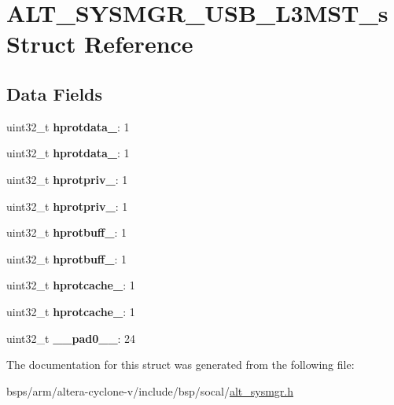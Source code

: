 \hypertarget{structALT__SYSMGR__USB__L3MST__s}{}\section{A\+L\+T\+\_\+\+S\+Y\+S\+M\+G\+R\+\_\+\+U\+S\+B\+\_\+\+L3\+M\+S\+T\+\_\+s Struct Reference}
\label{structALT__SYSMGR__USB__L3MST__s}
\subsection*{Data Fields}
\begin{DoxyCompactItemize}
\item 
\mbox{\label{structALT__SYSMGR__USB__L3MST__s_aa02b0f11931a8afcc1925e778977a89f}} 
uint32\+\_\+t {\bfseries hprotdata\+\_}\+: 1
\item 
\mbox{\label{structALT__SYSMGR__USB__L3MST__s_ad0e541615870d715237df3e728206236}} 
uint32\+\_\+t {\bfseries hprotdata\+\_}\+: 1
\item 
\mbox{\label{structALT__SYSMGR__USB__L3MST__s_ab379de425e746652e5dcb5ea31de1a67}} 
uint32\+\_\+t {\bfseries hprotpriv\+\_}\+: 1
\item 
\mbox{\label{structALT__SYSMGR__USB__L3MST__s_a6714299fde13af6226376ddb66f37986}} 
uint32\+\_\+t {\bfseries hprotpriv\+\_}\+: 1
\item 
\mbox{\label{structALT__SYSMGR__USB__L3MST__s_ad3a6d8b8cfc481d82bb99c27a841c3f9}} 
uint32\+\_\+t {\bfseries hprotbuff\+\_}\+: 1
\item 
\mbox{\label{structALT__SYSMGR__USB__L3MST__s_a69cf809a60e87bd730e79c89167746d5}} 
uint32\+\_\+t {\bfseries hprotbuff\+\_}\+: 1
\item 
\mbox{\label{structALT__SYSMGR__USB__L3MST__s_ad1ac2c6e45a5606ac6b9574aaf9e8a68}} 
uint32\+\_\+t {\bfseries hprotcache\+\_}\+: 1
\item 
\mbox{\label{structALT__SYSMGR__USB__L3MST__s_a610a60ede747510de40011b3ea6f83a5}} 
uint32\+\_\+t {\bfseries hprotcache\+\_}\+: 1
\item 
\mbox{\label{structALT__SYSMGR__USB__L3MST__s_a583b0c5b933a737dfe6ef380f61b869c}} 
uint32\+\_\+t {\bfseries \+\_\+\+\_\+pad0\+\_\+\+\_\+}\+: 24
\end{DoxyCompactItemize}


The documentation for this struct was generated from the following file\+:\begin{DoxyCompactItemize}
\item 
bsps/arm/altera-\/cyclone-\/v/include/bsp/socal/\mbox{\hyperlink{alt__sysmgr_8h}{alt\+\_\+sysmgr.\+h}}\end{DoxyCompactItemize}

